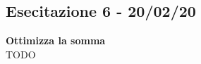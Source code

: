 \documentclass[../cheatSheetAlgoritmi.tex]{subfiles}
\begin{document}
\subsection{Esecitazione 6 - 20/02/20}
\textbf{Ottimizza la somma}\\
TODO
\end{document}
